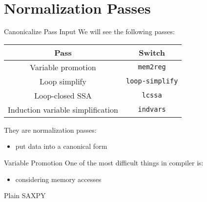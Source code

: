 
\section{Normalization Passes}
\begin{frame}{Canonicalize Pass Input}
We will see the following passes:

\begin{table}
\centering
\begin{tabular}{cc}
\toprule

\multicolumn{1}{c}{\textbf{Pass}}    &
\multicolumn{1}{c}{\textbf{Switch}} \\

\midrule

Variable promotion  &
\texttt{mem2reg}   \\

Loop simplify           &
\texttt{loop-simplify} \\

Loop-closed SSA  &
\texttt{lcssa}  \\

Induction variable simplification  &
\texttt{indvars}                  \\

\bottomrule
\end{tabular}
\end{table}

They are \alert{normalization} passes:

\begin{itemize}
\item put data into a canonical form
\end{itemize}
\end{frame}

\begin{frame}{Variable Promotion}
One of the most difficult things in compiler is:

\begin{itemize}
\item considering memory accesses
\end{itemize}

\vfill
\begin{block}{Plain SAXPY}
\centering
{}
\end{block}
\end{frame}

